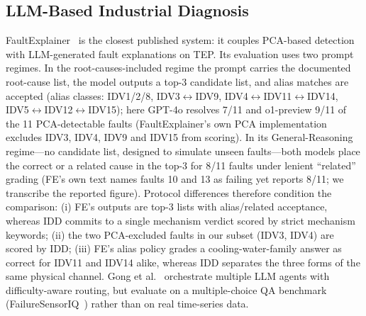 \documentclass[preprint,12pt]{elsarticle}
\begin{document}
\subsection{LLM-Based Industrial Diagnosis}
FaultExplainer~\cite{khan2024faultexplainer} is the closest published system: it couples PCA-based detection with LLM-generated fault explanations on TEP. Its evaluation uses two prompt regimes. In the root-causes-included regime the prompt carries the documented root-cause list, the model outputs a top-3 candidate list, and alias matches are accepted (alias classes: IDV1/2/8, IDV3$\leftrightarrow$IDV9, IDV4$\leftrightarrow$IDV11$\leftrightarrow$IDV14, IDV5$\leftrightarrow$IDV12$\leftrightarrow$IDV15); here GPT-4o resolves 7/11 and o1-preview 9/11 of the 11 PCA-detectable faults (FaultExplainer's own PCA implementation excludes IDV3, IDV4, IDV9 and IDV15 from scoring). In its General-Reasoning regime---no candidate list, designed to simulate unseen faults---both models place the correct or a related cause in the top-3 for 8/11 faults under lenient ``related'' grading (FE's own text names faults 10 and 13 as failing yet reports 8/11; we transcribe the reported figure). Protocol differences therefore condition the comparison: (i) FE's outputs are top-3 lists with alias/related acceptance, whereas IDD commits to a single mechanism verdict scored by strict mechanism keywords; (ii) the two PCA-excluded faults in our subset (IDV3, IDV4) are scored by IDD; (iii) FE's alias policy grades a cooling-water-family answer as correct for IDV11 and IDV14 alike, whereas IDD separates the three forms of the same physical channel. Gong et al.~\cite{gong2026harnessing} orchestrate multiple LLM agents with difficulty-aware routing, but evaluate on a multiple-choice QA benchmark (FailureSensorIQ~\cite{constantinides2025failuresensoriq}) rather than on real time-series data.
\end{document}
